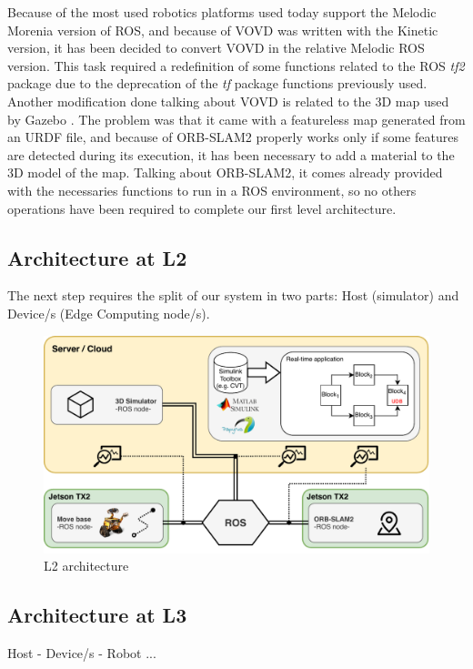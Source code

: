 Because of the most used robotics platforms used today support the Melodic Morenia \cite{rosmelodic} version of ROS, and because of VOVD was written with the Kinetic version, it has been decided to convert VOVD in the relative Melodic ROS version. This task required a redefinition of some functions related to the ROS \textit{tf2} package \cite{tfros} due to the deprecation of the \textit{tf} package functions previously used. 
Another modification done talking about VOVD is related to the 3D map used by Gazebo \cite{Gazebo}. The problem was that it came with a featureless map generated from an URDF file, and because of ORB-SLAM2 properly works only if some features are detected during its execution, it has been necessary to add a material to the 3D model of the map.
Talking about ORB-SLAM2, it comes already provided with the necessaries functions to run in a ROS environment, so no others operations have been required to complete our first level architecture.



\subsection{Architecture at L2} %
The next step requires the split of our system in two parts: Host (simulator) and Device/s (Edge Computing node/s).

\begin{figure}
	\centering
	\includegraphics[width=\textwidth]{images/L2_arch}
	\caption{L2 architecture}
	\label{fig:l2arch}
\end{figure}







\subsection{Architecture at L3}	%
Host - Device/s - Robot ...


